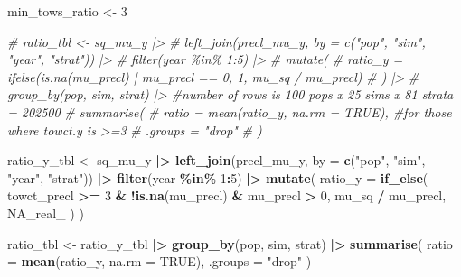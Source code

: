 \documentclass[
]{article}
\newenvironment{Shaded}{\begin{snugshade}}{\end{snugshade}}
\newcommand{\AttributeTok}[1]{\textcolor[rgb]{0.13,0.29,0.53}{#1}}
\newcommand{\CommentTok}[1]{\textcolor[rgb]{0.56,0.35,0.01}{\textit{#1}}}
\newcommand{\ConstantTok}[1]{\textcolor[rgb]{0.56,0.35,0.01}{#1}}
\newcommand{\DecValTok}[1]{\textcolor[rgb]{0.00,0.00,0.81}{#1}}
\newcommand{\FunctionTok}[1]{\textcolor[rgb]{0.13,0.29,0.53}{\textbf{#1}}}
\newcommand{\NormalTok}[1]{#1}
\newcommand{\OtherTok}[1]{\textcolor[rgb]{0.56,0.35,0.01}{#1}}
\newcommand{\SpecialCharTok}[1]{\textcolor[rgb]{0.81,0.36,0.00}{\textbf{#1}}}
\newcommand{\StringTok}[1]{\textcolor[rgb]{0.31,0.60,0.02}{#1}}
\begin{document}
\begin{Shaded}
\begin{Highlighting}[]
\NormalTok{min\_tows\_ratio }\OtherTok{\textless{}{-}} \DecValTok{3}

\CommentTok{\# ratio\_tbl \textless{}{-} sq\_mu\_y |\textgreater{}}
\CommentTok{\#   left\_join(precl\_mu\_y, by = c("pop", "sim", "year", "strat")) |\textgreater{}}
\CommentTok{\#   filter(year \%in\% 1:5) |\textgreater{}}
\CommentTok{\#   mutate(}
\CommentTok{\#     ratio\_y = ifelse(is.na(mu\_precl) | mu\_precl == 0, 1, mu\_sq / mu\_precl)}
\CommentTok{\#   ) |\textgreater{}}
\CommentTok{\#   group\_by(pop, sim, strat) |\textgreater{} \#number of rows is 100 pops x 25 sims x 81 strata = 202500}
\CommentTok{\#   summarise(}
\CommentTok{\#     ratio = mean(ratio\_y, na.rm = TRUE),  \#for those where towct.y is \textgreater{}=3 }
\CommentTok{\#     .groups = "drop"}
\CommentTok{\#   )}

\NormalTok{ratio\_y\_tbl }\OtherTok{\textless{}{-}}\NormalTok{ sq\_mu\_y }\SpecialCharTok{|\textgreater{}}
  \FunctionTok{left\_join}\NormalTok{(precl\_mu\_y, }\AttributeTok{by =} \FunctionTok{c}\NormalTok{(}\StringTok{"pop"}\NormalTok{, }\StringTok{"sim"}\NormalTok{, }\StringTok{"year"}\NormalTok{, }\StringTok{"strat"}\NormalTok{)) }\SpecialCharTok{|\textgreater{}}
  \FunctionTok{filter}\NormalTok{(year }\SpecialCharTok{\%in\%} \DecValTok{1}\SpecialCharTok{:}\DecValTok{5}\NormalTok{) }\SpecialCharTok{|\textgreater{}}
  \FunctionTok{mutate}\NormalTok{(}
    \AttributeTok{ratio\_y =} \FunctionTok{if\_else}\NormalTok{(}
\NormalTok{      towct\_precl }\SpecialCharTok{\textgreater{}=} \DecValTok{3} \SpecialCharTok{\&} \SpecialCharTok{!}\FunctionTok{is.na}\NormalTok{(mu\_precl) }\SpecialCharTok{\&}\NormalTok{ mu\_precl }\SpecialCharTok{\textgreater{}} \DecValTok{0}\NormalTok{,}
\NormalTok{      mu\_sq }\SpecialCharTok{/}\NormalTok{ mu\_precl,}
      \ConstantTok{NA\_real\_}
\NormalTok{    )}
\NormalTok{  )}

\NormalTok{ratio\_tbl }\OtherTok{\textless{}{-}}\NormalTok{ ratio\_y\_tbl }\SpecialCharTok{|\textgreater{}}
  \FunctionTok{group\_by}\NormalTok{(pop, sim, strat) }\SpecialCharTok{|\textgreater{}}
  \FunctionTok{summarise}\NormalTok{(}
    \AttributeTok{ratio =} \FunctionTok{mean}\NormalTok{(ratio\_y, }\AttributeTok{na.rm =} \ConstantTok{TRUE}\NormalTok{),}
    \AttributeTok{.groups =} \StringTok{"drop"}
\NormalTok{  )}


\end{Highlighting}
\end{Shaded}
\end{document}
